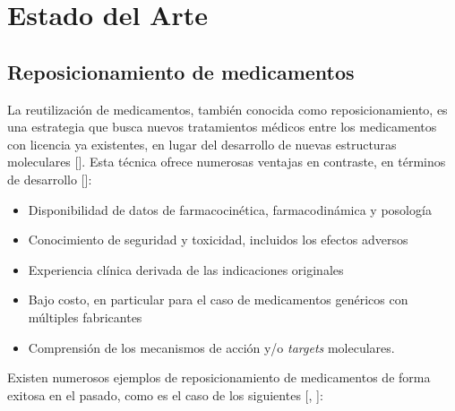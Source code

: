 \chapter{Estado del Arte}\label{chapter:state-of-the-art}

\section{Reposicionamiento de medicamentos}

La reutilización de medicamentos, también conocida como reposicionamiento, es una estrategia que busca nuevos tratamientos médicos entre los medicamentos con licencia ya existentes, en lugar del desarrollo de nuevas estructuras moleculares [\cite{repurposingconcept}]. Esta técnica ofrece numerosas ventajas en contraste, en términos de desarrollo [\cite{redo}]:
\begin{itemize}
    \item Disponibilidad de datos de farmacocinética, farmacodinámica y posología
    \item Conocimiento de seguridad y toxicidad, incluidos los efectos adversos
    \item Experiencia clínica derivada de las indicaciones originales
    \item Bajo costo, en particular para el caso de medicamentos genéricos con múltiples fabricantes
    \item Comprensión de los mecanismos de acción y/o \textit{targets} moleculares.
\end{itemize}
Existen numerosos ejemplos de reposicionamiento de medicamentos de forma exitosa en el pasado, como es el caso de los siguientes [\cite{drexamples}, \cite{drexamples2}]:
